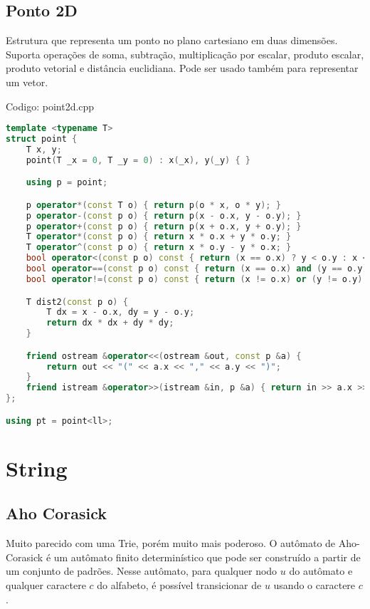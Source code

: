 \documentclass[10pt, a4paper, oneside]{book}
\begin{document}
\section{Ponto 2D}


Estrutura que representa um ponto no plano cartesiano em duas dimensões. Suporta operações de soma, subtração, multiplicação por escalar, produto escalar, produto vetorial e distância euclidiana. Pode ser usado também para representar um vetor.

\hfill

Codigo: point2d.cpp

\begin{lstlisting}[language=C++]
template <typename T>
struct point {
    T x, y;
    point(T _x = 0, T _y = 0) : x(_x), y(_y) { }

    using p = point;

    p operator*(const T o) { return p(o * x, o * y); }
    p operator-(const p o) { return p(x - o.x, y - o.y); }
    p operator+(const p o) { return p(x + o.x, y + o.y); }
    T operator*(const p o) { return x * o.x + y * o.y; }
    T operator^(const p o) { return x * o.y - y * o.x; }
    bool operator<(const p o) const { return (x == o.x) ? y < o.y : x < o.x; }
    bool operator==(const p o) const { return (x == o.x) and (y == o.y); }
    bool operator!=(const p o) const { return (x != o.x) or (y != o.y); }

    T dist2(const p o) {
        T dx = x - o.x, dy = y - o.y;
        return dx * dx + dy * dy;
    }

    friend ostream &operator<<(ostream &out, const p &a) {
        return out << "(" << a.x << "," << a.y << ")";
    }
    friend istream &operator>>(istream &in, p &a) { return in >> a.x >> a.y; }
};

using pt = point<ll>;\end{lstlisting}
\hfill

\newpage

%
%
%
%

\chapter{String}

\section{Aho Corasick}


Muito parecido com uma Trie, porém muito mais poderoso. O autômato de Aho-Corasick é um autômato finito determinístico que pode ser construído a partir de um conjunto de padrões. Nesse autômato, para qualquer nodo $u$ do autômato e qualquer caractere $c$ do alfabeto, é possível transicionar de $u$ usando o caractere $c$.
\end{document}
